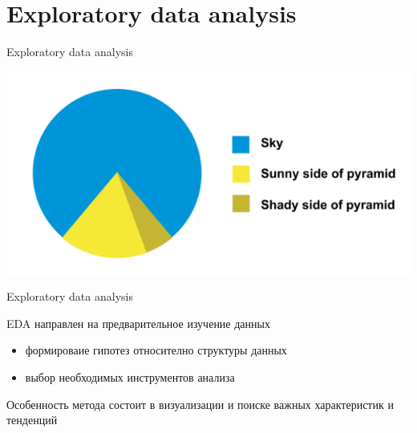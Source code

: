 \documentclass[aspectratio=169]{beamer}
\begin{document}
\section{Exploratory data analysis}

\begin{frame}{}

\begin{center}
{\LARGE Exploratory data analysis}

\vspace{2em}
\includegraphics[scale=0.4]{images/piechart.png}
\end{center}

\end{frame}

\begin{frame}{Exploratory data analysis}

EDA направлен на предварительное изучение данных
\begin{itemize}
\item формироваие гипотез относително структуры данных
\item выбор необходимых инструментов анализа
\end{itemize}
Особенность метода состоит в визуализации и поиске важных характеристик и тенденций

\end{frame}
\end{document}
